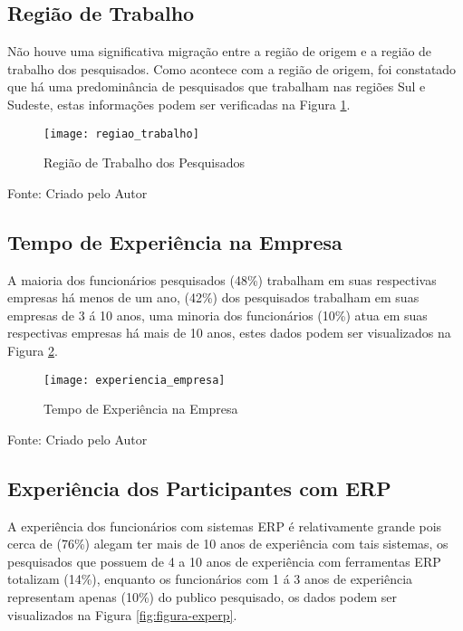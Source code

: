 \subsection{Região de Trabalho}

Não houve uma significativa migração entre a região de origem e a região de trabalho dos pesquisados. Como acontece com a região de origem, foi constatado que há uma predominância de pesquisados que trabalham nas regiões Sul e Sudeste, estas informações podem ser verificadas na Figura \ref{fig:figura-rgtrabalho}.

\begin{figure}[H]
	\centering	
	\caption{Região de Trabalho dos Pesquisados}
	\texttt{[image: regiao\_trabalho]}
	\label{fig:figura-rgtrabalho}
\end{figure}
\vspace{-0.8 cm} \hspace{2.65 cm} Fonte: Criado pelo Autor\newline

\subsection{Tempo de Experiência na Empresa}

A maioria dos funcionários pesquisados (48\%) trabalham em suas respectivas empresas há menos de um ano, (42\%) dos pesquisados trabalham em suas empresas de 3 á 10 anos, uma minoria dos funcionários (10\%) atua em suas respectivas empresas há mais de 10 anos, estes dados podem ser visualizados na Figura \ref{fig:figura-expempresa}.

\begin{figure}[H]
	\centering	
	\caption{Tempo de Experiência na Empresa}
	\texttt{[image: experiencia\_empresa]}
	\label{fig:figura-expempresa}
\end{figure}
\vspace{-0.8 cm} \hspace{2.65 cm} Fonte: Criado pelo Autor\newline

\subsection{Experiência dos Participantes com ERP}

A experiência dos funcionários com sistemas ERP é  relativamente grande pois  cerca de (76\%) alegam ter mais de 10 anos de experiência com tais sistemas, os pesquisados que possuem de 4 a 10 anos de experiência com ferramentas ERP totalizam (14\%), enquanto os funcionários com 1 á 3 anos de experiência representam apenas (10\%) do publico pesquisado, os dados podem ser visualizados na Figura \ref{fig:figura-experp}.

